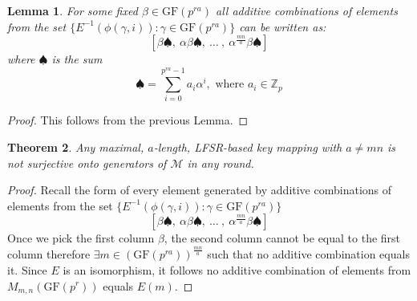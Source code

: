 \documentclass[11pt]{amsart}
\newcommand{\ZZ}{\mathbb{Z}}
\newcommand{\MM}{\mathcal{M}}
\newcommand{\GF}{\mathrm{GF}}
\newtheorem{theorem}{{\bf Theorem }}
\newtheorem{lemma}[theorem]{{\bf Lemma }}
\begin{document}
\begin{lemma}
For some fixed $\beta \in \GF(p^{ra})$ all additive combinations of elements from the set $\{ E^{-1}(\phi(\gamma,i)) : \gamma \in \GF(p^{ra}) \}$ can be written as:
\[
\left[ \beta \spadesuit,~ \alpha\beta \spadesuit, ~\dots~ ,~ \alpha^{\frac{mn}{a}}\beta \spadesuit \right]
\]
where $\spadesuit$ is the sum
\[
\spadesuit = \sum_{i=0}^{p^{ra} - 1} a_i \alpha^i, \text{ where } a_i \in \ZZ_p
\]
\end{lemma}
\begin{proof}
This follows from the previous Lemma.
\end{proof}

\begin{theorem} 
Any maximal, $a$-length, LFSR-based key mapping with $a \neq mn$ is not surjective onto generators of $\MM$ in any round.
\end{theorem}

\begin{proof}
Recall the form of every element generated by additive combinations of elements from the set $\{ E^{-1}(\phi(\gamma,i)) : \gamma \in \GF(p^{ra}) \}$
\[
\left[ \beta \spadesuit,~ \alpha\beta \spadesuit, ~\dots~ ,~ \alpha^{\frac{mn}{a}}\beta \spadesuit \right]
\]
Once we pick the first column $\beta$, the second column cannot be equal to the first column therefore $\exists m \in (\GF(p^{ra}))^{\frac{mn}{a}}$ such that no additive combination equals it. Since $E$ is an isomorphism, it follows no additive combination of elements from $M_{m,n}(\GF(p^r))$ equals $E(m)$.
\end{proof}
\end{document}
